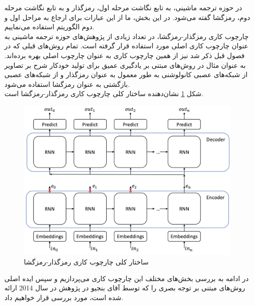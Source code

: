در حوزه ترجمه ماشینی، به تابع نگاشت مرحله اول، رمزگذار و به تابع نگاشت مرحله دوم، رمزگشا گفته می‌شود. در این بخش، ما از این عبارات برای ارجاع به مراحل اول و دوم الگوریتم استفاده می‌نماییم.
\\
چارچوب کاری رمزگذار-رمزگشا، در تعداد زیادی از پژوهش‌های حوزه ترجمه ماشینی به عنوان چارچوب کاری اصلی مورد استفاده قرار گرفته است. تمام روش‌های قبلی که در فصول قبل ذکر شد نیز از همین چارچوب کاری به عنوان چارچوب اصلی بهره برده‌اند. به عنوان مثال در روش‌های مبتنی بر یادگیری عمیق برای تولید خودکار شرح بر تصاویر از شبکه‌های عصبی کانولوشنی به طور معمول به عنوان رمزگذار و از شبکه‌های عصبی بازگشتی به عنوان رمزگشا استفاده می‌شود.
\\
شکل \ref{fig:5-1} نشان‌دهنده ساختار کلی چارچوب کاری رمزگذار-رمزگشا است.

\begin{figure}[h]
	\centering
	\includegraphics[scale=0.2]{Imgs/encoder-decoder.jpg}
	\caption{ساختار کلی چارچوب کاری رمزگذار-رمزگشا}
	\label{fig:5-1}
\end{figure}


در ادامه به بررسی بخش‌های مختلف این چارچوب کاری می‌پردازیم و سپس ایده اصلی روش‌های مبتنی بر توجه بصری را که توسط آقای بنجیو در پژوهش \cite{bahdanau2014neural} در سال 2014 ارائه شده است، مورد بررسی قرار خواهیم 
داد.


